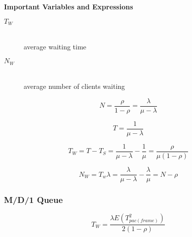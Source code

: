 \documentclass[../resumosRCOM.tex]{subfiles}
\begin{document}
\textbf{Important Variables and Expressions}
\begin{description}
    \item[\(T_{W}\)] \hfill \\ average waiting time
    \item[\(N_{W}\)] \hfill \\ average number of clients waiting
\end{description}

\begin{equation}
    N = \frac{\rho}{1-\rho} = \frac{\lambda}{\mu-\lambda}
\end{equation}

\begin{equation}
    T = \frac{1}{\mu-\lambda}
\end{equation}

\begin{equation}
    T_{W} = T - T_{S} = \frac{1}{\mu-\lambda} - \frac{1}{\mu} = \frac{\rho}{\mu(1-\rho)}
\end{equation}

\begin{equation}
    N_{W} = T_{w}\lambda = \frac{\lambda}{\mu-\lambda} - \frac{\lambda}{\mu} = N - \rho
\end{equation}

\subsubsection{M/D/1 Queue}

\begin{equation}
    T_{W} = \frac{\lambda E(T_{pac(frame)}^2)}{2(1-\rho)}
\end{equation}
\end{document}
